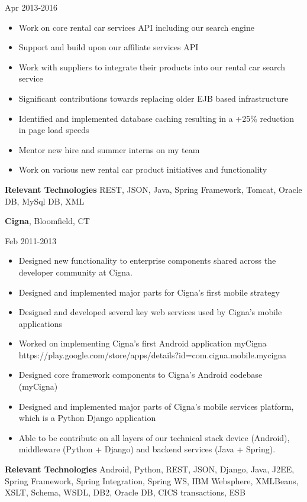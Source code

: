 \documentclass[a4paper,online]{adcv}
\begin{document}
\begin{adcvtabletwo}
   {Apr 2013-2016}
  \begin{itemize}
    \item Work on core rental car services API including our search engine
    \item Support and build upon our affiliate services API
    \item Work with suppliers to integrate their products into our rental car search service
    \item Significant contributions towards replacing older EJB based infrastructure
    \item Identified and implemented database caching resulting in a +25\% reduction in page load speeds
    \item Mentor new hire and summer interns on my team
    \item Work on various new rental car product initiatives and functionality
  \end{itemize}
  \adcvrowskip
  \textbf{Relevant Technologies} REST, JSON, Java, Spring Framework, Tomcat, Oracle DB, MySql DB, XML
  
  \adcvrowskip
  {\textbf{Cigna}, Bloomfield, CT}
  
   {Feb 2011-2013}
  \begin{itemize}
    \item Designed new functionality to enterprise components shared across the developer community at Cigna.
    \item Designed and implemented major parts for Cigna’s first mobile strategy
    \item Designed and developed several key web services used by Cigna’s mobile applications
    \item Worked on implementing Cigna’s first Android application myCigna https://play.google.com/store/apps/details?id=com.cigna.mobile.mycigna
    \item Designed core framework components to Cigna’s Android codebase (myCigna)
    \item Designed and implemented major parts of Cigna’s mobile services platform, which is a Python Django application
    \item Able to be contribute on all layers of our technical stack device (Android), middleware (Python + Django) and backend services (Java + Spring).

  \end{itemize}
  \adcvrowskip
  \textbf{Relevant Technologies} Android, Python, REST, JSON, Django, Java, J2EE, Spring Framework, Spring Integration, Spring WS, IBM Websphere, XMLBeans, XSLT, Schema, WSDL, DB2, Oracle DB, CICS transactions, ESB
  

\end{adcvtabletwo}
\end{document}
